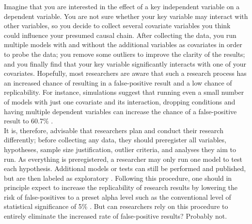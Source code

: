 Imagine that you are interested in the effect of a key independent variable on a dependent variable. You are not sure whether your key variable may interact with other variables, so you decide to collect several covariate variables you think could influence your presumed causal chain. After collecting the data, you run multiple models with and without the additional variables as covariates in order to probe the data; you remove some outliers to improve the clarity of the results; and you finally find that your key variable significantly interacts with one of your covariates. Hopefully, most researchers are aware that such a research process has an increased chance of resulting in a false-positive result and a low chance of replicability. For instance, simulations suggest that running even a small number of models with just one covariate and its interaction, dropping conditions and having multiple dependent variables can increase the chance of a false-positive result to 60.7\% \citep{Simmons2011}.\\

It is, therefore, advisable that researchers plan and conduct their research differently; before collecting any data, they should preregister all variables, hypotheses, sample size justification, outlier criteria, and analyses they aim to run. As everything is preregistered, a researcher may only run one model to test each hypothesis. Additional models or tests can still be performed and published, but are then labeled as exploratory \citep{Nosek2018}. Following this procedure, one should in principle expect to increase the replicability of research results by lowering the risk of false-positives to a preset alpha level such as the conventional level of statistical significance of 5\% \citep{Moore2016}. But can researchers rely on this procedure to entirely eliminate the increased rate of false-positive results? Probably not. \\

